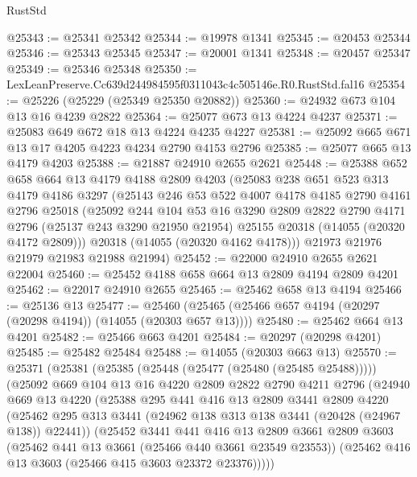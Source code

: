 \begin{lexlean}{RustStd}
\begin{coremodule}
@25343 := @25341 @25342
@25344 := @19978 @1341
@25345 := @20453 @25344
@25346 := @25343 @25345
@25347 := @20001 @1341
@25348 := @20457 @25347
@25349 := @25346 @25348
@25350 := LexLeanPreserve.Cc639d244984595f0311043c4c505146e.R0.RustStd.fal16
@25354 := @25226 (@25229 (@25349 @25350 @20882))
@25360 := @24932 @673 @104 @13 @16 @4239 @2822
@25364 := @25077 @673 @13 @4224 @4237
@25371 := @25083 @649 @672 @18 @13 @4224 @4235 @4227
@25381 := @25092 @665 @671 @13 @17 @4205 @4223 @4234 @2790 @4153 @2796
@25385 := @25077 @665 @13 @4179 @4203
@25388 := @21887 @24910 @2655 @2621
@25448 := @25388
    @652
    @658
    @664
    @13
    @4179
    @4188
    @2809
    @4203
    (@25083
      @238
      @651
      @523
      @313
      @4179
      @4186
      @3297
      (@25143
        @246
        @53
        @522
        @4007
        @4178
        @4185
        @2790
        @4161
        @2796
        @25018
        (@25092
          @244
          @104
          @53
          @16
          @3290
          @2809
          @2822
          @2790
          @4171
          @2796
          (@25137 @243 @3290 @21950 @21954)
          @25155
          @20318
          (@14055 (@20320 @4172 @2809)))
        @20318
        (@14055 (@20320 @4162 @4178)))
      @21973
      @21976
      @21979
      @21983
      @21988
      @21994)
@25452 := @22000 @24910 @2655 @2621 @22004
@25460 := @25452 @4188 @658 @664 @13 @2809 @4194 @2809 @4201
@25462 := @22017 @24910 @2655
@25465 := @25462 @658 @13 @4194
@25466 := @25136 @13
@25477 := @25460 (@25465 (@25466 @657 @4194 (@20297 (@20298 @4194)) (@14055 (@20303 @657 @13))))
@25480 := @25462 @664 @13 @4201
@25482 := @25466 @663 @4201
@25484 := @20297 (@20298 @4201)
@25485 := @25482 @25484
@25488 := @14055 (@20303 @663 @13)
@25570 := @25371
    (@25381
      (@25385 (@25448 (@25477 (@25480 (@25485 @25488)))))
      (@25092
        @669
        @104
        @13
        @16
        @4220
        @2809
        @2822
        @2790
        @4211
        @2796
        (@24940
          @669
          @13
          @4220
          (@25388
            @295
            @441
            @416
            @13
            @2809
            @3441
            @2809
            @4220
            (@25462 @295 @313 @3441 (@24962 @138 @313 @138 @3441 (@20428 (@24967 @138)) @22441))
            (@25452
              @3441
              @441
              @416
              @13
              @2809
              @3661
              @2809
              @3603
              (@25462 @441 @13 @3661 (@25466 @440 @3661 @23549 @23553))
              (@25462 @416 @13 @3603 (@25466 @415 @3603 @23372 @23376)))))

\end{coremodule}
\end{lexlean}
